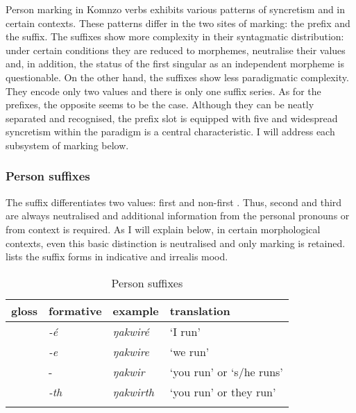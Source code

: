 Person marking in Komnzo verbs exhibits various patterns of syncretism and  in certain contexts. These patterns differ in the two sites of  marking: the prefix and the suffix. The suffixes show more complexity in their syntagmatic distribution: under certain conditions they are reduced to  morphemes, neutralise their  values and, in addition, the status of the first singular as an independent morpheme is questionable. On the other hand, the suffixes show less paradigmatic complexity. They encode only two  values and there is only one suffix series. As for the prefixes, the opposite seems to be the case. Although they can be neatly separated and recognised, the prefix slot is equipped with five  and widespread syncretism within the paradigm is a central characteristic. I will address each subsystem of  marking below.

\subsubsection{Person suffixes} \label{personsuffsection}

The  suffix differentiates two  values: first and non-first . Thus, second and third  are always neutralised and additional information from the personal pronouns or from context is required. As I will explain below, in certain morphological contexts, even this basic distinction is neutralised and only  marking is retained.  lists the suffix forms in indicative and irrealis mood.

\begin{table}
\caption{Person suffixes}
\label{perssuff}
	\begin{tabularx}{\textwidth}{XXXl}
		\lsptoprule
		{gloss} & {formative} & {example} &{translation}\\\midrule
		\Fsg &\emph{-é} &\emph{ŋakwiré}	&`I run'\\
		\Fnsg &\emph{-e} &\emph{ŋakwire} &`we run'\\
		\Stsg &-\Zero &\emph{ŋakwir} &`you run' or `s/he runs'\\
		\Stnsg &\emph{-th} &\emph{ŋakwirth}	&`you run' or they run'\\
		\lspbottomrule
	\end{tabularx}
\end{table}%


